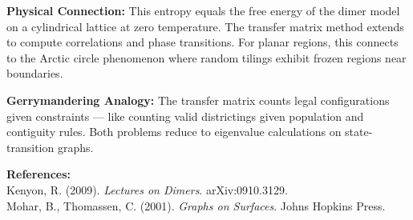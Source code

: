 \begin{technical}
\noindent\textbf{Physical Connection:} This entropy equals the free energy of the dimer model on a cylindrical lattice at zero temperature. The transfer matrix method extends to compute correlations and phase transitions. For planar regions, this connects to the Arctic circle phenomenon where random tilings exhibit frozen regions near boundaries.

\noindent\textbf{Gerrymandering Analogy:} The transfer matrix counts legal configurations given constraints — like counting valid districtings given population and contiguity rules. Both problems reduce to eigenvalue calculations on state-transition graphs.

\vspace{0.5em}
\noindent\textbf{References:}\\
{\footnotesize
Kenyon, R. (2009). \textit{Lectures on Dimers}. arXiv:0910.3129.\\
Mohar, B., Thomassen, C. (2001). \textit{Graphs on Surfaces}. Johns Hopkins Press.
}
\end{technical}